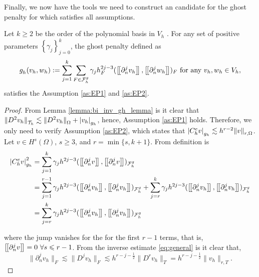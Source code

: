 Finally, we now have the tools we need to construct an candidate for the ghost penalty for which satisfies all assumptions.

\begin{proposition}
    Let $k\ge  2$ be the order of the polynomial basis in $V_{h}$ .
    For any set of positive parameters $\left\{ \gamma _{j} \right\} _{j=0}^{k}$, the ghost penalty defined as
    \begin{equation}
        \label{eq:ghost_penalty}
    g^{}_{h}( v_{h},w_{h})  := \sum_{j=1}^{k} \sum_{F \in \mathcal{F} _{h}^{g}}^{} \gamma _{j} h^{2j-3}_{F} ( \left[\!\left[  \partial ^{j}_{n} v_{h}  \right]\!\right], \left[\!\left[  \partial ^{j}_{n} w_{h}  \right]\!\right]  ) _{F} \text{ for any } v_{h},w_{h} \in V_{h},
    \end{equation}
    satisfies the Assumption \ref{as:EP1} and \ref{as:EP2}.
\end{proposition}

\begin{proof}
  From Lemma \ref{lemma:bi_inv_gh_lemma} is it clear that $
    \| D^2v_{h} \|_{ \mathcal{T} _{h} }^{  }  \lesssim \| D^2 v_{h} \|_{ \Omega   }^{  } + \left\lvert  v_{h}  \right\rvert _{g_{h}}
    $, hence, Assumption \ref{as:EP1} holds.
    Therefore, we only need to verify Assumption \ref{as:EP2}, which states that $ \left\lvert  C^{e}_{h} v  \right\rvert_{g_{h}} \lesssim h^{r-2} \| v \|_{r, \Omega   }^{  }$.
    Let $v  \in H^{s}( \Omega ) $, $s\ge 3$,  and $r = \min\{s,k+1\} $. From definition is \[
        \begin{split}
        \abs{ C^{e}_{h} v }_{g_{h}}^{2} & = \sum_{j=1}^{k}  \gamma _{j} h^{2j-3} ( \jump{ \partial ^{j}_{n} v }, \jump{ \partial ^{j}_{n} v }  ) _{\mathcal{F}_{h}^{g} } \\
& = \sum_{j=1}^{r-1}  \gamma _{j} h^{2j-3} ( \jump{ \partial ^{j}_{n} v_{h} }, \jump{ \partial ^{j}_{n} v_{h} }  ) _{\mathcal{F}_{h}^{g} } + \sum_{j=r}^{k}  \gamma _{j} h^{2j-3} ( \jump{ \partial ^{j}_{n} v_{h} }, \jump{ \partial ^{j}_{n} v_{h} }  ) _{\mathcal{F}_{h}^{g} } \\
&= \sum_{j=r}^{k}  \gamma _{j} h^{2j-3} ( \jump{ \partial ^{j}_{n} v_{h} }, \jump{ \partial ^{j}_{n} v_{h} }  ) _{\mathcal{F}_{h}^{g} } \\
        \end{split}
    \]

    where the jump vanishes for the for the first $r-1$ terms, that is,  $\left[\!\left[  \partial ^{j}_{n} v  \right]\!\right] = 0  \  \forall s \leqslant r-1$.
    From the inverse estimate \eqref{eq:general} is it clear that,
    \begin{equation}
        \| \partial _{n}^{j}v_{h} \|_{ F }^{  } \lesssim \| D^{j}v_{h} \|_{ F }^{  } \lesssim h^{r- j - \frac{1}{2}}\| D^{r}v_{h} \|_{  T}^{  } = h^{r- j - \frac{1}{2}} \| v_{h} \|_{r, T  }^{  }   .
    \end{equation}


\end{proof}
